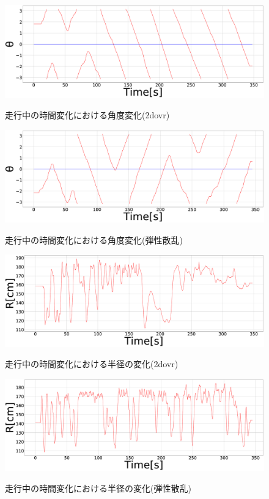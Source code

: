 \documentclass[twocolumn,dvipdfmx]{jarticle}
\begin{document}
\begin{figure}[h]
\begin{center}
  \includegraphics[width=0.9\linewidth]{pic/106_shita.eps}
  \caption{走行中の時間変化における角度変化(2dovr)}
  \label{fig:theta_2dovr}
  \includegraphics[width=0.9\linewidth]{pic/112_shita.eps}
  \caption{走行中の時間変化における角度変化(弾性散乱)}
  \label{fig:theta_ela}
  \includegraphics[width=0.9\linewidth]{pic/106_R.eps}
  \caption{走行中の時間変化における半径の変化(2dovr)}
  \label{fig:R_2dovr}
  \includegraphics[width=0.9\linewidth]{pic/112_R.eps}
  \caption{走行中の時間変化における半径の変化(弾性散乱)}
  \label{fig:R_ela}

\end{center}
\end{figure}
\end{document}
